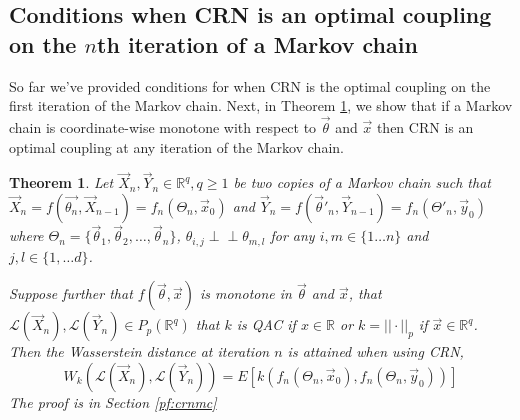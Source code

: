 \documentclass[12pt]{article}
\theoremstyle{plain}%
\newtheorem{theorem}{Theorem}[section]
\theoremstyle{definition}
\newcommand{\indep}{\perp \!\!\! \perp}
\begin{document}
	
	\subsection{Conditions when CRN is an optimal coupling on the $n$th iteration of a Markov chain}\label{sec:nstep}
	So far we've provided conditions for when CRN is the optimal coupling on the first iteration of the Markov chain. Next, in Theorem \ref{thm:crnmc}, we show that if a Markov chain is coordinate-wise monotone with respect to $\vec{\theta}$ and $\vec{x}$ then CRN is an optimal coupling at any iteration of the Markov chain.
	
	\begin{theorem}\label{thm:crnmc}
		Let $\vec{X}_n,\vec{Y}_n\in \mathbb{R}^q,q\geq 1$ be two copies of a Markov chain %
		such that $\vec{X}_n=f(\vec{\theta_n},\vec{X}_{n-1})=f_n(\Theta_n, \vec{x}_0)$ and $\vec{Y}_n=f(\vec{\theta}'_n,\vec{Y}_{n-1})=f_n(\Theta'_n, \vec{y}_0)$ where $\Theta_n=\{\vec{\theta}_1,\vec{\theta}_2,\ldots, \vec{\theta}_n\}$, $\theta_{i,j}\indep \theta_{m,l}$ for any $i,m\in \{1\ldots n\}$ and $j,l\in\{1,\ldots d\}$. 
		
		Suppose further that $f(\vec{\theta},\vec{x})$ is monotone in $\vec{\theta}$ and $\vec{x}$, that $\mathcal{L}(\vec{X}_n),\mathcal{L}(\vec{Y}_n)\in P_p(\mathbb{R}^q)$ that $k$ is QAC if $x\in\mathbb{R}$ or $k=||\cdot||_p$ if $\vec{x}\in\mathbb{R}^q$. 
		Then the Wasserstein distance at iteration $n$ is attained when using CRN,
		\begin{equation}\label{eqcrnmc}
			W_{k}(\mathcal{L}(\vec{X}_n),\mathcal{L}(\vec{Y}_n))= %
			 E[k(f_n(\Theta_n,\vec{x}_0),f_n(\Theta_n,\vec{y}_0))]
		\end{equation}
		The proof is in Section \ref{pf:crnmc}
	\end{theorem}
	
\end{document}
